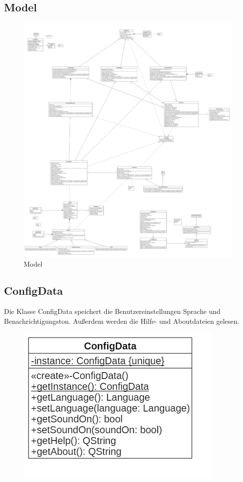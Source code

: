 \subsection{Model}

\begin{figure}[H]
\includegraphics[width=1\linewidth]{img/Klassendiagramm/Model}
\caption{Model}
\label{fig:model}
\end{figure}


\subsection*{ConfigData}

Die Klasse ConfigData speichert die Benutzereinstellungen Sprache und Benachrichtigungston. Außerdem werden die Hilfe- und Aboutdateien gelesen.

\begin{figure}[H]
\centering
\includegraphics[scale=0.5]{img/Klassendiagramm/Klassen/ConfigData}
\label{fig:configData}
\end{figure}


